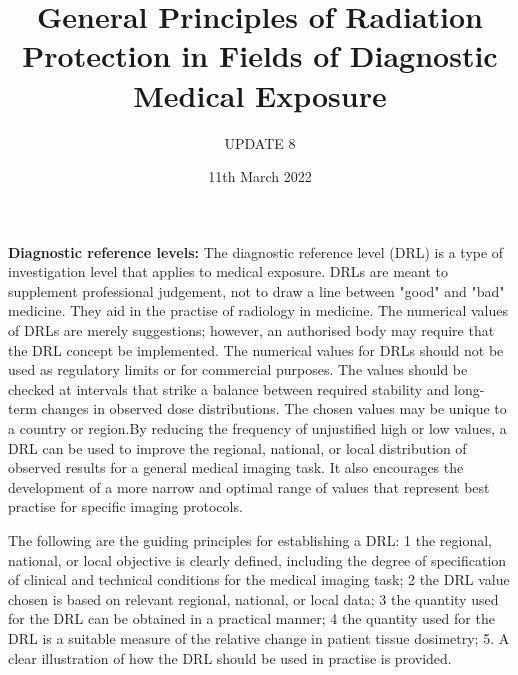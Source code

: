 \documentclass[12pt]{article}
\title{General Principles of Radiation Protection in Fields of Diagnostic Medical Exposure}
\author{UPDATE 8}
\date{11th March 2022}
\begin{document}
\maketitle

\textbf{Diagnostic reference levels:}
The diagnostic reference level (DRL) is a type of investigation level that applies to medical exposure. DRLs are meant to supplement professional judgement, not to draw a line between "good" and "bad" medicine. They aid in the practise of radiology in medicine. The numerical values of DRLs are merely suggestions; however, an authorised body may require that the DRL concept be implemented. The numerical values for DRLs should not be used as regulatory limits or for commercial purposes. The values should be checked at intervals that strike a balance between required stability and long-term changes in observed dose distributions. The chosen values may be unique to a country or region.By reducing the frequency of unjustified high or low values, a DRL can be used to improve the regional, national, or local distribution of observed results for a general medical imaging task. It also encourages the development of a more narrow and optimal range of values that represent best practise for specific imaging protocols.

\raggedright 

The following are the guiding principles for establishing a DRL: 1 the regional, national, or local objective is clearly defined, including the degree of specification of clinical and technical conditions for the medical imaging task; 2 the DRL value chosen is based on relevant regional, national, or local data; 3 the quantity used for the DRL can be obtained in a practical manner; 4 the quantity used for the DRL is a suitable measure of the relative change in patient tissue dosimetry; 5. A clear illustration of how the DRL should be used in practise is provided.
\end{document}
